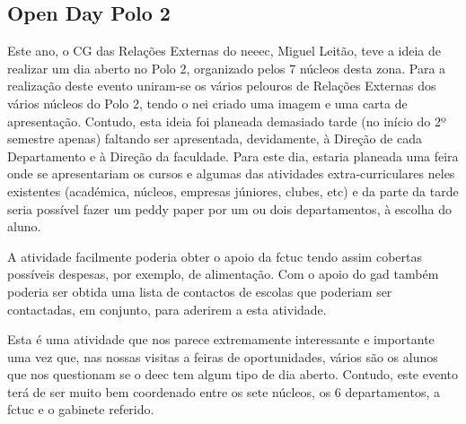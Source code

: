 
\subsection{Open Day Polo 2}

Este ano, o CG das Relações Externas do \acrshort{neeec}, Miguel Leitão, teve a ideia de realizar um dia aberto no Polo 2, organizado pelos 7 núcleos desta zona. Para a realização deste evento uniram-se os vários pelouros de Relações Externas dos vários núcleos do Polo 2, tendo o \acrshort{nei} criado uma imagem e uma carta de apresentação. Contudo, esta ideia foi planeada demasiado tarde (no início do 2º semestre apenas) faltando ser apresentada, devidamente, à Direção de cada Departamento e à Direção da faculdade. Para este dia, estaria planeada uma feira onde se apresentariam os cursos e algumas das atividades extra-curriculares neles existentes (académica, núcleos, empresas júniores, clubes, etc) e da parte da tarde seria possível fazer um peddy paper por um ou dois departamentos, à escolha do aluno.

A atividade facilmente poderia obter o apoio da \acrshort{fctuc} tendo assim cobertas possíveis despesas, por exemplo, de alimentação. Com o apoio do \acrfull{gad} também poderia ser obtida uma lista de contactos de escolas que poderiam ser contactadas, em conjunto, para aderirem a esta atividade.

Esta é uma atividade que nos parece extremamente interessante e importante uma vez que, nas nossas visitas a feiras de oportunidades, vários são os alunos que nos questionam se o \acrshort{deec} tem algum tipo de dia aberto. Contudo, este evento terá de ser muito bem coordenado entre os sete núcleos, os 6 departamentos, a \acrshort{fctuc} e o gabinete referido.